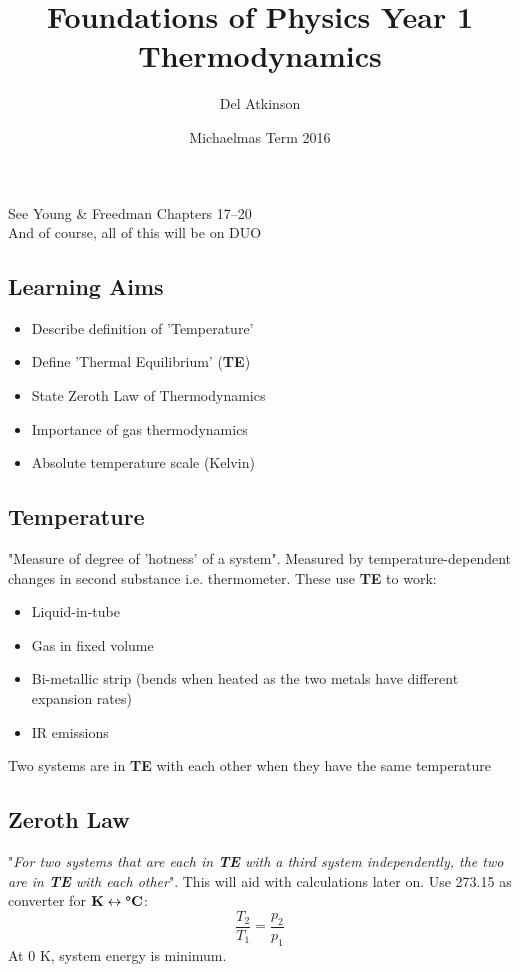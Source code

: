 \documentclass[a4paper, 11pt, normalem]{report}
\title{Foundations of Physics Year 1 \\ Thermodynamics \vspace{-20pt}}
\author{Del Atkinson}
\date{\vspace{-15pt}Michaelmas Term 2016}
\begin{document}
\maketitle
\tableofcontents

\chapter{}
See Young \& Freedman Chapters 17--20 \\
And of course, all of this will be on DUO
\section{Learning Aims}
\begin{itemize}
    \item Describe definition of 'Temperature'
    \item Define 'Thermal Equilibrium' (\textbf{TE})
    \item State Zeroth Law of Thermodynamics
    \item Importance of gas thermodynamics
    \item Absolute temperature scale (Kelvin)
\end{itemize}

\section{Temperature}
"Measure of degree of 'hotness' of a system".
Measured by temperature-dependent changes in second substance i.e. thermometer.
These use \textbf{TE} to work:
\begin{itemize}
    \item Liquid-in-tube
    \item Gas in fixed volume
    \item Bi-metallic strip (bends when heated as the two metals have different expansion rates)
    \item IR emissions
\end{itemize}
Two systems are in \textbf{TE} with each other when they have the same temperature

\section{Zeroth Law}
"\textit{For two systems that are each in \textbf{TE} with a third system independently, the two are in \textbf{TE} with each other}".
This will aid with calculations later on. 
Use 273.15 as converter for $\textbf{K}\leftrightarrow\textbf{{\textdegree}C}$:
\begin{equation}
    \dfrac{T_{2}}{T_{1}} = \dfrac{p_{2}}{p_{1}}
\end{equation}
At 0 K, system energy is minimum.
\end{document}
